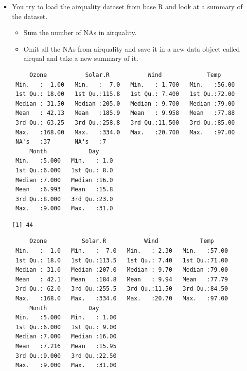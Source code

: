 \documentclass[
  letterpaper,
  DIV=11,
  numbers=noendperiod]{scrreprt}
\providecommand{\tightlist}{%
  \setlength{\itemsep}{0pt}\setlength{\parskip}{0pt}}\usepackage{longtable,booktabs,array}
\begin{document}
\begin{itemize}
\item
  You try to load the airquality dataset from base R and look at a
  summary of the dataset.

  \begin{itemize}
  \tightlist
  \item
    Sum the number of NAs in airquality.
  \item
    Omit all the NAs from airquality and save it in a new data object
    called airqual and take a new summary of it.
  \end{itemize}

\begin{verbatim}
     Ozone           Solar.R           Wind             Temp      
 Min.   :  1.00   Min.   :  7.0   Min.   : 1.700   Min.   :56.00  
 1st Qu.: 18.00   1st Qu.:115.8   1st Qu.: 7.400   1st Qu.:72.00  
 Median : 31.50   Median :205.0   Median : 9.700   Median :79.00  
 Mean   : 42.13   Mean   :185.9   Mean   : 9.958   Mean   :77.88  
 3rd Qu.: 63.25   3rd Qu.:258.8   3rd Qu.:11.500   3rd Qu.:85.00  
 Max.   :168.00   Max.   :334.0   Max.   :20.700   Max.   :97.00  
 NA's   :37       NA's   :7                                       
     Month            Day      
 Min.   :5.000   Min.   : 1.0  
 1st Qu.:6.000   1st Qu.: 8.0  
 Median :7.000   Median :16.0  
 Mean   :6.993   Mean   :15.8  
 3rd Qu.:8.000   3rd Qu.:23.0  
 Max.   :9.000   Max.   :31.0  
\end{verbatim}

\begin{verbatim}
[1] 44
\end{verbatim}

\begin{verbatim}
     Ozone          Solar.R           Wind            Temp      
 Min.   :  1.0   Min.   :  7.0   Min.   : 2.30   Min.   :57.00  
 1st Qu.: 18.0   1st Qu.:113.5   1st Qu.: 7.40   1st Qu.:71.00  
 Median : 31.0   Median :207.0   Median : 9.70   Median :79.00  
 Mean   : 42.1   Mean   :184.8   Mean   : 9.94   Mean   :77.79  
 3rd Qu.: 62.0   3rd Qu.:255.5   3rd Qu.:11.50   3rd Qu.:84.50  
 Max.   :168.0   Max.   :334.0   Max.   :20.70   Max.   :97.00  
     Month            Day       
 Min.   :5.000   Min.   : 1.00  
 1st Qu.:6.000   1st Qu.: 9.00  
 Median :7.000   Median :16.00  
 Mean   :7.216   Mean   :15.95  
 3rd Qu.:9.000   3rd Qu.:22.50  
 Max.   :9.000   Max.   :31.00  
\end{verbatim}
\end{itemize}
\end{document}

